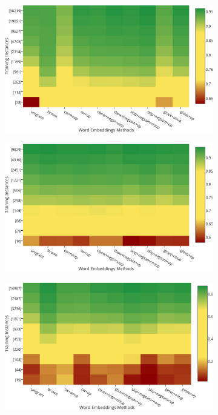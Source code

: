 \begin{figure}
\centering
\begin{subfigure}{7cm}
	\centering
    \includegraphics[scale=0.4]{plots/map-pos-color-invert}    	
	\subcaption{\pos \accuracy}	
	\label{pos}
\end{subfigure}
\begin{subfigure}{7cm}
	\centering
    \includegraphics[scale=0.4]{plots/map-chunk-color-invert}
	\subcaption{\chunking \fscore}	
	\label{chu}
\end{subfigure}
\begin{subfigure}{7cm}
	\centering
    \includegraphics[scale=0.4]{plots/map-ner-color-invert}    	

\end{subfigure}
\end{figure}
